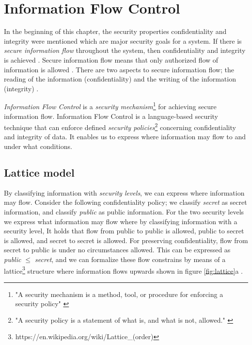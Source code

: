 

\section{Information Flow Control} %
In the beginning of this chapter, the security properties confidentiality and integrity were mentioned which are major security goals for a system. If there is \emph{secure information flow} throughout the system, then confidentiality and integrity is achieved \cite{Hedin2011}. Secure information flow means that only authorized flow of information is allowed \cite{Denning1976}. There are two aspects to secure information flow; the reading of the information (confidentiality) and the writing of the information (integrity) \cite{Hedin2011}. 

\emph{Information Flow Control} is a \emph{security mechanism}\footnote{"A security mechanism is a method, tool, or procedure for enforcing a security policy" \cite{Bishop2004}} for achieving secure information flow.
Information Flow Control is a language-based security technique that can enforce defined \emph{security policies}\footnote{"A security policy is a statement of what is, and what is not, allowed." \cite{Bishop2004}} concerning confidentiality and integrity of data. It enables us to express where information may flow to and under what conditions. 

\subsection{Lattice model}\label{lattice}

By classifying information with \emph{security levels}, we can express where information may flow. Consider the following confidentiality policy; we classify \emph{secret} as secret information, and classify \emph{public} as public information. For the two security levels we express what information may flow where by classifying information with a security level, It holds that flow from public to public is allowed, public to secret is allowed, and secret to secret is allowed. For preserving confidentiality, flow from secret to public is under no circumstances allowed.  This can be expressed as \emph{public $\leq$ secret}, and we can formalize these flow constrains by means of a lattice\footnote{https://en.wikipedia.org/wiki/Lattice\_(order)} structure where information flows upwards shown in figure \ref{fig:lattice}a \cite{Smith}.


